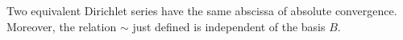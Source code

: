 Two equivalent Dirichlet series have the same abscissa of absolute convergence. Moreover, the relation $\sim$ just defined is independent of the basis $B$.
